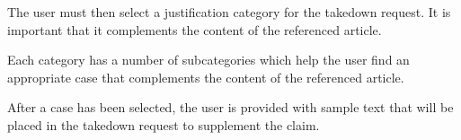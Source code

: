 \begin{minipage}{\textwidth}
  \centering
  \begin{minipage}[t]{4.6cm}
    \vspace{0pt}
    \centering
    \begin{minipage}{4.4cm}
      The user must then select a justification category for the takedown request. It is important that it complements the content of the referenced article.
    \end{minipage}
  \end{minipage}
  \begin{minipage}[t]{4.6cm}
    \vspace{0pt}
    \centering
    \begin{minipage}{4.4cm}
      Each category has a number of subcategories which help the user find an appropriate case that complements the content of the referenced article.
    \end{minipage}
  \end{minipage}
  \begin{minipage}[t]{4.6cm}
    \vspace{0pt}
    \centering
    \begin{minipage}{4.4cm}
      After a case has been selected, the user is provided with sample text that will be placed in the takedown request to supplement the claim.
    \end{minipage}
  \end{minipage}
\end{minipage}

